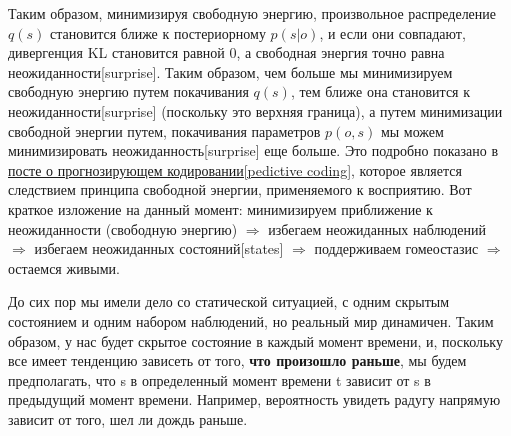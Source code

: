 \documentclass[twoside,leqno, 11pt]{article}
\begin{document}
	\begin{figure}[h]	
		\label{ris:image}
	\end{figure}
	
	Таким образом, минимизируя свободную энергию, произвольное распределение $q(s)$ становится ближе к постериорному $p(s|o)$, и если они совпадают, дивергенция KL становится равной 0, а свободная энергия точно равна неожиданности[surprise]. Таким образом, чем больше мы минимизируем свободную энергию путем покачивания $q(s)$, тем ближе она становится к неожиданности[surprise] (поскольку это верхняя граница), а путем минимизации свободной энергии путем, покачивания параметров $p(o,s)$ мы можем минимизировать неожиданность[surprise] еще больше. Это подробно показано в  \href{https://medium.com/@solopchuk/intuitions-on-predictive-coding-and-the-free-energy-principle-3fc5bcedc754}{посте о прогнозирующем кодировании[pedictive coding]}, которое является следствием принципа свободной энергии, применяемого к восприятию. Вот краткое изложение на данный момент: минимизируем приближение к неожиданности (свободную энергию) $\Rightarrow$ избегаем неожиданных наблюдений $\Rightarrow$ избегаем неожиданных состояний[states] $\Rightarrow$ поддерживаем гомеостазис $\Rightarrow$ остаемся живыми.
	
	До сих пор мы имели дело со статической ситуацией, с одним скрытым состоянием и одним набором наблюдений, но реальный мир динамичен. Таким образом, у нас будет скрытое состояние в каждый момент времени, и, поскольку все имеет тенденцию зависеть от того, \textbf{что произошло раньше}, мы будем предполагать, что s в определенный момент времени t зависит от s в предыдущий момент времени. Например, вероятность увидеть радугу напрямую зависит от того, шел ли дождь раньше.
	
	\begin{figure}[h]	
		\label{ris:image}
	\end{figure}
	
\end{document}
